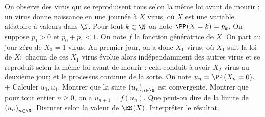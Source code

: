 \begin{exercise}[title=Modèle de Galton-Watson]
On observe des virus qui se reproduisent tous selon la même loi avant de mourir : un virus donne naissance en une journée à $X$ virus, où $X$ est une variable aléatoire à valeurs dans $\N$. Pour tout $k \in \N$ on note $\PP(X=k)=p_{k} $. On suppose $p_{1}>0$ et $p_{0}+p_{1}<1 $. On note $f$ la fonction génératrice de $X$. On part au jour zéro de $X_{0}=1$ virus. Au premier jour, on a donc $X_{1}$ virus, où $X_{1}$ suit la loi de $X ;$ chacun de ces $X_{1}$ virus évolue alors indépendamment des autres virus et se reproduit selon la même loi avant de mourir : cela conduit à avoir $X_{2}$ virus au deuxième jour; et le processus continue de la sorte. On note $u_{n}=\PP\left(X_{n}=0\right)$.
\question+ Calculer $u_{0}, u_{1}$.
\question Montrer que la suite $\left(u_{n}\right)_{n \in \N}$ est convergente.
\question Montrer que pour tout entier $n \geqslant 0$, on a $u_{n+1}=f\left(u_{n}\right)$.
\question Que peut-on dire de la limite de $\left(u_{n}\right)_{n \in \N}$. Discuter selon la valeur de $\ES(X)$. Interpréter le résultat.
\endquestions 
\end{exercise}



